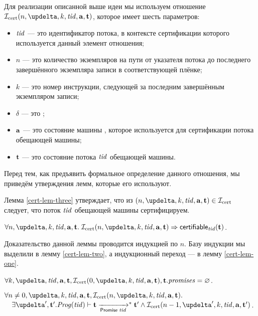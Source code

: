 
Для реализации описанной выше идеи мы используем отношение
$\invCert(n, \delta, k, \tId, \aT, \tT)$, которое имеет шесть параметров:
\begin{itemize}
  \item $\mathit{tid}$ --- это идентификатор потока, в контексте сертификации которого используется данный элемент отношения;
  \item $n$ --- это количество экземпляров на пути от указателя потока до последнего завершённого экземпляра записи в
    соответствующей плёнке;
  \item $k$ --- это номер инструкции, следующей за последним завершённым экземпляром записи;
  \item $\delta$ --- это ;
  \item $\mathbf{a}$ --- это состояние машины \ARMt, которое используется для сертификации потока обещающей машины;
  \item $\mathbf{t}$ --- это состояние потока $\mathit{tid}$ обещающей машины.
\end{itemize}
Перед тем, как предъявить формальное определение данного отношения, мы приведём утверждения лемм, которые
его используют.

Лемма \ref{cert-lem-three} утверждает, что из $(n, \delta, k, \tId, \aT, \tT) \in \invCert$ следует,
что поток $\mathit{tid}$ обещающей машины сертифицируем.
\begin{lemma}
\label{cert-lem-three}
$\forall n, \delta, k, \tId, \aT, \tT. \; \invCert(n, \delta, k, \tId, \aT, \tT) \Rightarrow \certifiableTid(\tT)$.
\end{lemma}
Доказательство данной леммы проводится индукцией по $n$.
Базу индукции мы выделили в лемму \ref{cert-lem-two}, а индукционный переход --- в лемму \ref{cert-lem-one}.

\begin{lemma}
\label{cert-lem-two}
$\forall k, \delta, \tId, \aT, \tT, \invCert(0, \delta, k, \tId, \aT, \tT), \tT.\PromSet = \emptyset$.
\end{lemma}

\begin{lemma}
\label{cert-lem-one}
$\forall n \not = 0, \delta, k, \tId, \aT, \tT, \invCert(n, \delta, k, \tId, \aT, \tT).$ \\
${} \quad \exists \delta', \tT'. \Cfprom(\tId) \vdash \tT \promTStep^{*} \tT' \land \invCert(n - 1, \delta', k, \tId, \aT, \tT')$.
\end{lemma}

